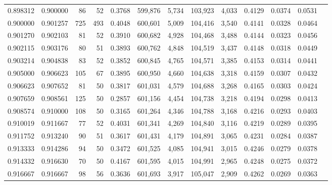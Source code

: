 \begin{tabular}{rrrrrrrrrrrrr}
0.898312 & 0.900000 &     86 &    52 &                                     0.3768 & 599,876 &   5,734 & 103,923 &   4,033 & 0.4129 & 0.0374 & 0.0531 \\
0.900000 & 0.901257 &    725 &   493 &                                     0.4048 & 600,601 &   5,009 & 104,416 &   3,540 & 0.4141 & 0.0328 & 0.0464 \\
0.901270 & 0.902103 &     81 &    52 &                                     0.3910 & 600,682 &   4,928 & 104,468 &   3,488 & 0.4144 & 0.0323 & 0.0456 \\
0.902115 & 0.903176 &     80 &    51 &                                     0.3893 & 600,762 &   4,848 & 104,519 &   3,437 & 0.4148 & 0.0318 & 0.0449 \\
0.903214 & 0.904838 &     83 &    52 &                                     0.3852 & 600,845 &   4,765 & 104,571 &   3,385 & 0.4153 & 0.0314 & 0.0441 \\
0.905000 & 0.906623 &    105 &    67 &                                     0.3895 & 600,950 &   4,660 & 104,638 &   3,318 & 0.4159 & 0.0307 & 0.0432 \\
0.906623 & 0.907652 &     81 &    50 &                                     0.3817 & 601,031 &   4,579 & 104,688 &   3,268 & 0.4165 & 0.0303 & 0.0424 \\
0.907659 & 0.908561 &    125 &    50 &                                     0.2857 & 601,156 &   4,454 & 104,738 &   3,218 & 0.4194 & 0.0298 & 0.0413 \\
0.908574 & 0.910000 &    108 &    50 &                                     0.3165 & 601,264 &   4,346 & 104,788 &   3,168 & 0.4216 & 0.0293 & 0.0403 \\
0.910019 & 0.911667 &     77 &    52 &                                     0.4031 & 601,341 &   4,269 & 104,840 &   3,116 & 0.4219 & 0.0289 & 0.0395 \\
0.911752 & 0.913240 &     90 &    51 &                                     0.3617 & 601,431 &   4,179 & 104,891 &   3,065 & 0.4231 & 0.0284 & 0.0387 \\
0.913333 & 0.914286 &     94 &    50 &                                     0.3472 & 601,525 &   4,085 & 104,941 &   3,015 & 0.4246 & 0.0279 & 0.0378 \\
0.914332 & 0.916630 &     70 &    50 &                                     0.4167 & 601,595 &   4,015 & 104,991 &   2,965 & 0.4248 & 0.0275 & 0.0372 \\
0.916667 & 0.916667 &     98 &    56 &                                     0.3636 & 601,693 &   3,917 & 105,047 &   2,909 & 0.4262 & 0.0269 & 0.0363 \\

\end{tabular}
